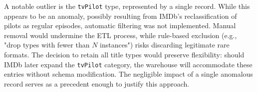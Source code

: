 A notable outlier is the \texttt{tvPilot} type, represented by a single record. While this appears to be an anomaly, possibly resulting from IMDb's reclassification of pilots as regular episodes, automatic filtering was not implemented. Manual removal would undermine the ETL process, while rule-based exclusion (e.g., "drop types with fewer than $N$ instances") risks discarding legitimate rare formats. The decision to retain all title types would preserve flexibility: should IMDb later expand the \texttt{tvPilot} category, the warehouse will accommodate these entries without schema modification. The negligible impact of a single anomalous record serves as a precedent enough to justify this approach.